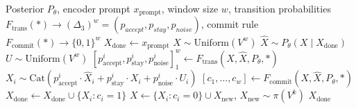 \begin{algorithm}[tb]
\caption{Generic Diffusion Sampler}
\label{alg:gen-adapt}
\begin{algorithmic}[1]
\Require Posterior $P_\theta$, encoder prompt $x_{\mathrm{prompt}}$, window size $w$, transition probabilities $F_{\mathrm{trans}}(*) \to (\Delta_{3})^w = (p_{accept}, p_{stay}, p_{noise})$, commit rule $F_{\mathrm{commit}}(*) \to \{0, 1\}^w$
\State $X_{\mathrm{done}} \gets x_{\mathrm{prompt}}$
\State $X \sim \text{Uniform}(V^w)$
    \State $\hat{X} \sim P_{\theta}(X \mid X_{\mathrm{done}})$
    \State $U \sim \text{Uniform}(V^w)$
    \State $[p_{\mathrm{accept}}^i, p_{\mathrm{stay}}^i, p_{\mathrm{noise}}^i]_1^w \gets F_{\mathrm{trans}}(X, \hat{X}, P_{\theta}, *)$
    \State $X_i \sim \text{Cat} \left( p_{\mathrm{accept}}^i \cdot \hat{X}_i + p_{\mathrm{stay}}^i \cdot X_i + p_{\mathrm{noise}}^i \cdot U_i \right)$
    \State $[c_1, \dots, c_w] \gets F_{\mathrm{commit}}(X, \hat{X}, P_{\theta}, *)$ 
    \State $X_{\mathrm{done}} \gets X_{\mathrm{done}} \cup \{X_{i} : c_i = 1\}$ 
    \State $X \gets \{X_{i}: c_i = 0 \} \cup X_{\mathrm{new}}$, $X_{\mathrm{new}} \sim \pi(V^k)$ 
\EndWhile
\State \Return $X_{\mathrm{done}}$
\end{algorithmic}
\end{algorithm}